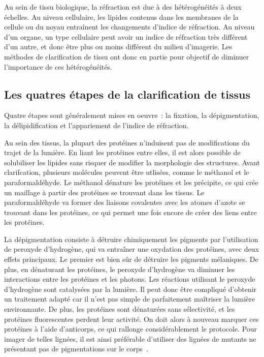 \documentclass[\main/main.tex]{subfiles}
\begin{document}
%
Au sein de tissu biologique, la réfraction est due à des hétérogénéités à deux échelles. Au niveau cellulaire, les lipides contenus dans les membranes de la cellule ou du noyau entraînent les changements d'indice de réfraction. Au niveau d'un organe, un type cellulaire peut avoir un indice de réfraction très différent d'un autre, et donc être plus ou moins différent du milieu d'imagerie.
%
Les méthodes de clarification de tissu ont donc en partie pour objectif de diminuer l'importance de ces hétérogénéités.

\subsection{Les quatres étapes de la clarification de tissus\label{sec:clarification:etapes}}

Quatre étapes sont généralement mises en oeuvre~\cite{tainaka_2016,ueda_2020}: la fixation, la dépigmentation, la délipidification et l'appariement de l'indice de réfraction.
%

%
Au sein des tissus, la plupart des protéines n'induisent pas de modifications du trajet de la lumière. En liant les protéines entre elles, il est alors possible de solubiliser les lipides sans risquer de modifier la morphologie des structures. Avant clarifcation, plusieurs molécules peuvent être utlisées, comme le méthanol et le paraformaldéhyde. Le méthanol dénature les protéines et les précipite, ce qui crée un maillage à partir des protéines se trouvant dans les tissus. Le paraformaldéhyde va former des liaisons covalentes avec les atomes d'azote se trouvant dans les protéines, ce qui permet une fois encore de créer des liens entre les protéines.

%
La dépigmentation consiste à détruire chimiquement les pigments par l'utilisation de peroxyde d'hydrogène, qui va entraîner une oxydation des protéines, avec deux effets principaux. Le premier est bien sûr de détruire les pigments mélaniques. De plus, en dénaturant les protéines, le peroxyde d'hydrogène va diminuer les interactions entre les protéines et les photons.
%
Les réactions utilisant le peroxyde d'hydrogène sont catalysées par la lumière. Il peut donc être compliqué d'obtenir un traitement adapté car il n'est pas simple de parfaitement maîtriser la lumière environnante. De plus, les protéines sont dénaturées sans sélectivité, et les protéines fluorescentes perdent leur activité. On doit alors à nouveau marquer ces protéines à l'aide d'anticorps, ce qui rallonge considérablement le protocole.
%
Pour imager de telles lignées, il est ainsi préférable d'utiliser des lignées de  mutants ne présentant pas de pigmentations sur le corps~\cite{white_2008,antinucci_2016}.
\end{document}
